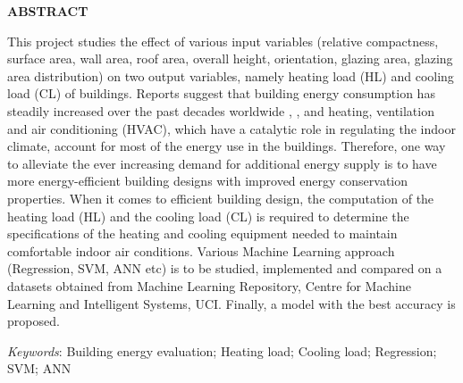 \thispagestyle{plain}
\begin{center}
\textbf{\textbf{\fontsize{16pt}{24pt}\selectfont ABSTRACT}}
\end{center}

\vspace{0.3cm}
\fontsize{12pt}{18pt}\selectfont This project studies the effect of various input variables
(relative compactness, surface area, wall area, roof area, overall height, orientation, glazing area, glazing area distribution) on two output variables, namely heating load (HL) and cooling load (CL) of buildings. Reports suggest that building energy consumption has
steadily increased over the past decades worldwide \cite{perez2008pout}, \cite{cai2009ren}, and heating, ventilation and air conditioning
(HVAC), which have a catalytic role in regulating the indoor climate, account for most of the energy use in
the buildings. Therefore, one way to alleviate the ever increasing demand for additional energy supply is to
have more energy-efficient building designs with improved energy conservation properties. When it comes
to efficient building design, the computation of the heating load (HL) and the cooling load (CL) is required to
determine the specifications of the heating and cooling equipment needed to maintain comfortable indoor air
conditions.
Various Machine Learning approach (Regression, SVM, ANN etc) is to be studied, implemented and
compared on a datasets obtained from Machine Learning Repository, Centre for Machine Learning and
Intelligent Systems, UCI. Finally, a model with the best accuracy is proposed.

\textit{Keywords}: Building energy evaluation; Heating load; Cooling load; Regression; SVM; ANN

\newpage
